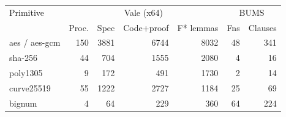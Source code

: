 \begin{tabular}{lrrrrrr}
\toprule
Primitive & \multicolumn{4}{c}{Vale (x64)} & \multicolumn{2}{c}{BUMS}\\
 & Proc. & Spec & Code+proof & F* lemmas & Fns & Clauses\\
\midrule
aes / aes-gcm & 150 & 3881 & 6744 & 8032 & 48 & 341\\
sha-256 & 44 & 704 & 1555 & 2080 & 4 & 16\\
poly1305 & 9 & 172 & 491 & 1730 & 2 & 14\\
curve25519 & 55 & 1222 & 2727 & 1184 & 25 & 69\\
bignum & 4 & 64 & 229 & 360 & 64 & 224\\
\bottomrule
\end{tabular}
